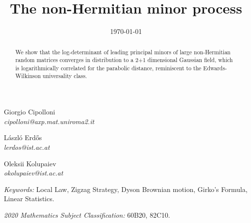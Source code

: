 \documentclass[10pt]{amsart}
\title[Minor process]{The non-Hermitian minor process}
\date{\today}
\numberwithin{equation}{section}
\begin{document}
\maketitle

\vspace{0.25cm}

\renewcommand{\thefootnote}{\fnsymbol{footnote}}	


\noindent
\mbox{}%
\hfill%
\begin{minipage}{0.19\textwidth}
	\centering
	{Giorgio Cipolloni}\footnotemark[1]\\
	\footnotesize{\textit{cipolloni@axp.mat.uniroma2.it}}
\end{minipage}
\hfill%
\begin{minipage}{0.19\textwidth}
	\centering
	{L\'aszl\'o Erd\H{o}s}\footnotemark[2]\\
	\footnotesize{\textit{lerdos@ist.ac.at}}
\end{minipage}
\hfill%
\begin{minipage}{0.19\textwidth}
	\centering
	{Oleksii Kolupaiev}\footnotemark[2]\\
	\footnotesize{\textit{okolupaiev@ist.ac.at}}
\end{minipage}
\hfill%
\mbox{}%
%

\renewcommand*{\thefootnote}{\arabic{footnote}}
\vspace{0.25cm}


\begin{abstract} 
We show that the log-determinant of leading principal minors of large non-Hermitian random matrices converges in distribution to a 2+1 dimensional Gaussian field, which is logarithmically correlated for the parabolic distance, 
reminiscent to the Edwards-Wilkinson universality class.
\end{abstract}
\vspace{0.15cm}

\footnotesize \textit{Keywords:} Local Law, Zigzag Strategy, Dyson Brownian motion, Girko’s Formula, Linear Statistics.

\footnotesize \textit{2020 Mathematics Subject Classification:} 60B20, 82C10.
%
\vspace{0.25cm}
%
\normalsize
\end{document}
